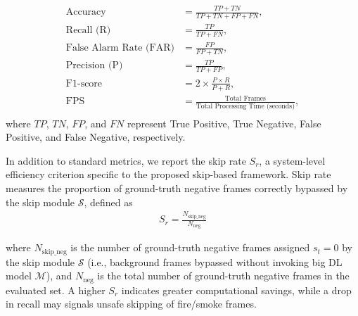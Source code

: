 \begin{align}
  \text{Accuracy} &= \frac{TP + TN}{TP + TN + FP + FN}, \\
  \text{Recall (R)} &= \frac{TP}{TP + FN}, \\
  \text{False Alarm Rate (FAR)} &= \frac{FP}{FP + TN}, \\
  \text{Precision (P)} &= \frac{TP}{TP + FP}, \\
  \text{F1-score} &= 2 \times \frac{P \times R}{P + R}, \\
  \text{FPS} &= \frac{\text{Total Frames}}{\text{Total Processing Time (seconds)}},\\
\end{align}
where $TP$, $TN$, $FP$, and $FN$ represent True Positive, True Negative, False Positive, and False Negative, respectively.

In addition to standard metrics, we report the skip rate $S_r$, a system-level
efficiency criterion specific to the proposed skip-based framework. Skip rate
measures the proportion of ground-truth negative frames correctly bypassed by
the skip module $\mathcal{S}$, defined as
\begin{align}
  S_r = \frac{N_{\text{skip\_neg}}}{N_{\text{neg}}}
\end{align}

where $N_{\text{skip\_neg}}$ is the number of ground-truth negative frames
assigned $s_t = 0$ by the skip module $\mathcal{S}$ (i.e., background frames
bypassed without invoking big DL model $\mathcal{M}$), and $N_{\text{neg}}$ is
the total number of ground-truth negative frames in the evaluated set. A higher
$S_r$ indicates greater computational savings, while a drop in recall may
signals unsafe skipping of fire/smoke frames.